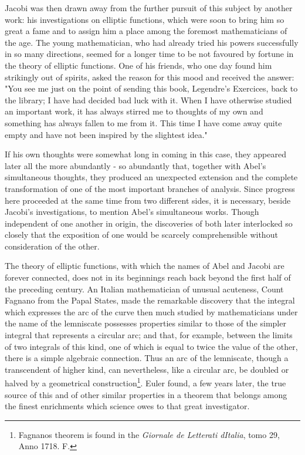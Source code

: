 \documentclass[11pt]{article}
\begin{document}
Jacobi was then drawn away from the further pursuit of this subject by another work: his investigations on elliptic functions, which were soon to bring him so great a fame and to assign him a place among the foremost mathematicians of the age. The young mathematician, who had already tried his powers successfully in so many directions, seemed for a longer time to be not favoured by fortune in the theory of elliptic functions. One of his friends, who one day found him strikingly out of spirits, asked the reason for this mood and received the answer: "You see me just on the point of sending this book, Legendre's Exercices, back to the library; I have had decided bad luck with it. When I have otherwise studied an important work, it has always stirred me to thoughts of my own and something has always fallen to me from it. This time I have come away quite empty and have not been inspired by the slightest idea."

If his own thoughts were somewhat long in coming in this case, they appeared later all the more abundantly - so abundantly that, together with Abel's simultaneous thoughts, they produced an unexpected extension and the complete transformation of one of the most important branches of analysis. Since progress here proceeded at the same time from two different sides, it is necessary, beside Jacobi's investigations, to mention Abel's simultaneous works. Though independent of one another in origin, the discoveries of both later interlocked so closely that the exposition of one would be scarcely comprehensible without consideration of the other.

The theory of elliptic functions, with which the names of Abel and Jacobi are forever connected, does not in its beginnings reach back beyond the first half of the preceding century. An Italian mathematician of unusual acuteness, Count Fagnano from the Papal States, made the remarkable discovery that the integral which expresses the arc of the curve then much studied by mathematicians under the name of the lemniscate possesses properties similar to those of the simpler integral that represents a circular arc; and that, for example, between the limits of two integrals of this kind, one of which is equal to twice the value of the other, there is a simple algebraic connection. Thus an arc of the lemniscate, though a transcendent of higher kind, can nevertheless, like a circular arc, be doubled or halved by a geometrical construction\footnote{Fagnano\textquotesingle{}s theorem is found in the \emph{Giornale de\textquotesingle{} Letterati d\textquotesingle{}Italia}, tomo 29, Anno 1718. F.}. Euler found, a few years later, the true source of this and of other similar properties in a theorem that belongs among the finest enrichments which science owes to that great investigator.
\end{document}
